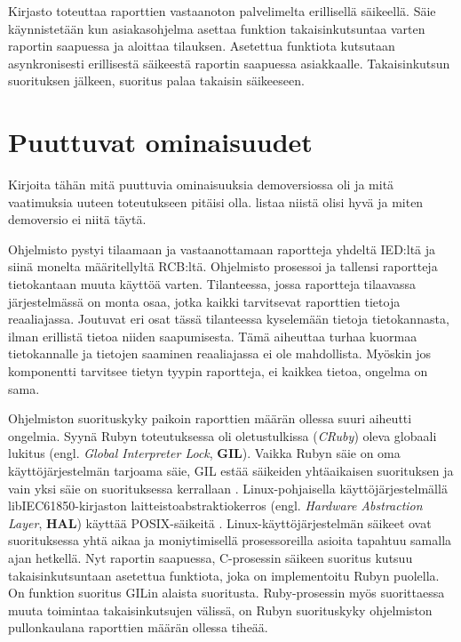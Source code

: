 Kirjasto toteuttaa raporttien vastaanoton palvelimelta erillisellä säikeellä. Säie käynnistetään kun asiakasohjelma asettaa funktion takaisinkutsuntaa varten raportin saapuessa ja aloittaa tilauksen. Asetettua funktiota kutsutaan asynkronisesti erillisestä säikeestä raportin saapuessa asiakkaalle. Takaisinkutsun suorituksen jälkeen, suoritus palaa takaisin säikeeseen.


\section{Puuttuvat ominaisuudet}
\begin{it}
	Kirjoita tähän mitä puuttuvia ominaisuuksia demoversiossa oli ja mitä vaatimuksia uuteen toteutukseen pitäisi olla. listaa niistä olisi hyvä ja miten demoversio ei niitä täytä.
	
\end{it}
Ohjelmisto pystyi tilaamaan ja vastaanottamaan raportteja yhdeltä IED:ltä ja siinä monelta määritellyltä RCB:ltä. Ohjelmisto prosessoi ja tallensi raportteja tietokantaan muuta käyttöä varten. Tilanteessa, jossa raportteja tilaavassa järjestelmässä on monta osaa, jotka kaikki tarvitsevat raporttien tietoja reaaliajassa. Joutuvat eri osat tässä tilanteessa kyselemään tietoja tietokannasta, ilman erillistä tietoa niiden saapumisesta. Tämä aiheuttaa turhaa kuormaa tietokannalle ja tietojen saaminen reaaliajassa ei ole mahdollista. Myöskin jos komponentti tarvitsee tietyn tyypin raportteja, ei kaikkea tietoa, ongelma on sama.

Ohjelmiston suorituskyky paikoin raporttien määrän ollessa suuri aiheutti ongelmia. Syynä Rubyn toteutuksessa oli oletustulkissa (\emph{CRuby}) oleva globaali lukitus (engl. \emph{Global Interpreter Lock}, \textbf{GIL}). Vaikka Rubyn säie on oma käyttöjärjestelmän tarjoama säie, GIL estää säikeiden yhtäaikaisen suorituksen ja vain yksi säie on suorituksessa kerrallaan \mbox{\cite[s.~131--133]{Odaira2014}}. Linux-pohjaisella käyttöjärjestelmällä libIEC61850-kirjaston laitteistoabstraktiokerros (engl. \emph{Hardware Abstraction Layer}, \textbf{HAL}) käyttää POSIX-säikeitä \cite{libIEC61850-repo}. Linux-käyttöjärjestelmän säikeet ovat suorituksessa yhtä aikaa ja moniytimisellä prosessoreilla asioita tapahtuu samalla ajan hetkellä. Nyt raportin saapuessa, C-prosessin säikeen suoritus kutsuu takaisinkutsuntaan asetettua funktiota, joka on implementoitu Rubyn puolella. On funktion suoritus GILin alaista suoritusta. Ruby-prosessin myös suorittaessa muuta toimintaa takaisinkutsujen välissä, on Rubyn suorituskyky ohjelmiston pullonkaulana raporttien määrän ollessa tiheää.

